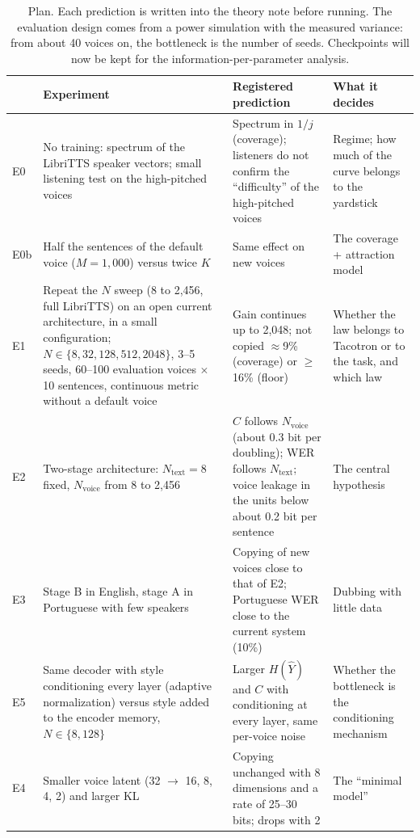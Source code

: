 \documentclass[a4paper,11pt]{article}
\begin{document}
\begin{table}[H]
\centering\small
\begin{tabular}{@{}p{0.6cm}p{4.6cm}p{5.4cm}p{4.2cm}@{}}
\toprule
& Experiment & Registered prediction & What it decides\\
\midrule
E0 & No training: spectrum of the LibriTTS speaker vectors; small listening test on the high-pitched voices & Spectrum in $1/j$ (coverage); listeners do not confirm the ``difficulty'' of the high-pitched voices & Regime; how much of the curve belongs to the yardstick\\
E0b & Half the sentences of the default voice ($M=1{,}000$) versus twice $K$ & Same effect on new voices & The coverage + attraction model\\
E1 & Repeat the $N$ sweep (8 to 2,456, full LibriTTS) on an open current architecture, in a small configuration; $N\in\{8,32,128,512,2048\}$, 3--5 seeds, 60--100 evaluation voices $\times$ 10 sentences, continuous metric without a default voice & Gain continues up to 2,048; not copied $\approx$9\% (coverage) or $\ge$16\% (floor) & Whether the law belongs to Tacotron or to the task, and which law\\
E2 & Two-stage architecture: $N_{\text{text}}=8$ fixed, $N_{\text{voice}}$ from 8 to 2,456 & $C$ follows $N_{\text{voice}}$ (about 0.3 bit per doubling); WER follows $N_{\text{text}}$; voice leakage in the units below about 0.2 bit per sentence & The central hypothesis\\
E3 & Stage B in English, stage A in Portuguese with few speakers & Copying of new voices close to that of E2; Portuguese WER close to the current system (10\%) & Dubbing with little data\\
E5 & Same decoder with style conditioning every layer (adaptive normalization) versus style added to the encoder memory, $N \in \{8, 128\}$ & Larger $H(\hat Y)$ and $C$ with conditioning at every layer, same per-voice noise & Whether the bottleneck is the conditioning mechanism\\
E4 & Smaller voice latent (32 $\rightarrow$ 16, 8, 4, 2) and larger KL & Copying unchanged with 8 dimensions and a rate of 25--30 bits; drops with 2 & The ``minimal model''\\
\bottomrule
\end{tabular}
\caption{Plan. Each prediction is written into the theory note before running. The evaluation design comes from a power simulation with the measured variance: from about 40 voices on, the bottleneck is the number of seeds. Checkpoints will now be kept for the information-per-parameter analysis.}
\end{table}
\end{document}
